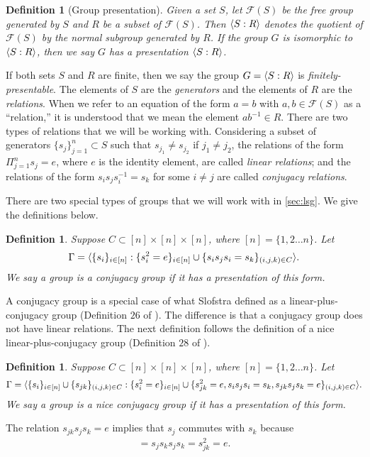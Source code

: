 \documentclass[11pt,letterpaper]{article}
\DeclarePairedDelimiter{\ip}{\langle}{\rangle}
\newcommand{\1}{\mathbb{1}}
\newtheorem{definition}[theorem]{Definition}
\theoremstyle{definition}
\begin{document}
\begin{definition}[Group presentation]
    Given a set $S$, let $\mathcal{F}(S)$ be the free group generated by $S$ and $R$ be a subset of $\mathcal{F}(S)$.
    Then $\ip{S:R}$ denotes the quotient of $\mathcal{F}(S)$
    by the normal subgroup generated by $R$.
    If the group $G$ is isomorphic to $\ip{S:R}$,
    then we say $G$ 
    has a presentation $\ip{S:R}$. 
\end{definition}
If both sets $S$ and $R$ are finite, then we say the group $G = \ip{S:R}$ is \emph{finitely-presentable}.
The elements of $S$ are the \emph{generators} and the elements
of $R$ are the \emph{relations}.
When we refer to an equation
of the form $a = b$ with $a, b \in \mathcal{F} ( S )$ as a ``relation,'' 
it is understood 
that we mean the element $ab^{-1} 
\in R$.
There are two types of relations that we will be working with.
Considering a subset of generators $\{ s_j \}_{j=1}^n \subset S$ such that $s_{j_1} \neq s_{j_2}$ if $j_1 \neq j_2$,
the relations of the form $\Pi_{j=1}^n s_j  = e$, where $e$ is the identity element, are called 
\emph{linear relations};
and the relations of the form
$s_i s_j s_i^{-1} = s_k$ for some $i \neq j$ are called \emph{conjugacy relations}.   

There are two special types of groups that we will work with in \cref{sec:lsg}. We give the definitions below.
\begin{definition}
    \label{def:spe_conj_grp}
    Suppose $C \subset [n] \times [n] \times [n]$, where $[n] = \{1,2 \dots n\}$. 
    Let
    \begin{align*}
        \Gamma = \ip{\{s_i\}_{i \in [n]}  :
        \{s_i^2=e\}_{i\in [n]} \cup 
        \{ s_i s_j s_i = s_k\}_{(i,j,k)\in C}}.
    \end{align*}
    We say a group is a conjugacy group if it has a presentation of this form. 
\end{definition}
A conjugacy group is a special case of what Slofstra defined as 
a linear-plus-conjugacy group (Definition $26$ of \cite{slofstra2017}). 
The difference is that a conjugacy group does not have linear relations. 
The next definition follows the 
definition of a nice linear-plus-conjugacy group (Definition $28$ of \cite{slofstra2017}).
\begin{definition}
    \label{def:nice_conj_grp}
    Suppose $C \subset [n] \times [n] \times [n]$, where $[n] = \{1,2 \dots n\}$. 
    Let 
    \begin{align*}
        \Gamma = \ip{\{s_i\}_{i \in [n]} \cup \{s_{jk}\}_{(i,j,k)\in C} :
        \{s_i^2=e\}_{i\in [n]} \cup 
        \{s_{jk}^2 = e, s_is_js_i = s_k, s_{jk}s_js_k = e\}_{(i,j,k)\in C}}.
    \end{align*}
    We say a group is a nice conjugacy group if it has a presentation of this form. 
\end{definition}
The relation $s_{jk} s_js_k = e$ implies that $s_j$ commutes with $s_k$
because
\begin{align*}
    [s_j, s_k] = s_js_ks_js_k = s_{jk}^2 = e.
\end{align*}
\end{document}
